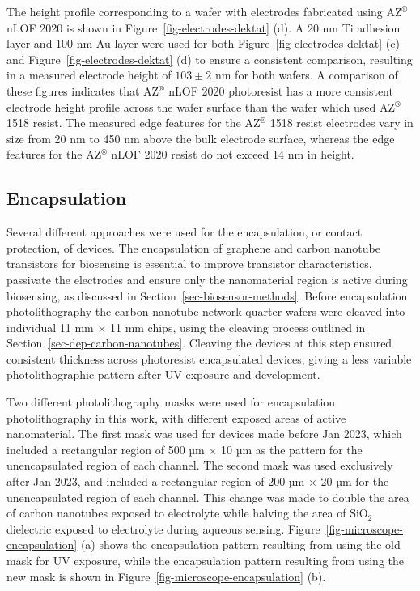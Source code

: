 \documentclass[
  a4paper,
]{scrbook}
\begin{document}
The height profile corresponding to a wafer with electrodes fabricated
using AZ\(^\circledR\) nLOF 2020 is shown in
Figure~\ref{fig-electrodes-dektat} (d). A 20 nm Ti adhesion layer and
100 nm Au layer were used for both Figure~\ref{fig-electrodes-dektat}
(c) and Figure~\ref{fig-electrodes-dektat} (d) to ensure a consistent
comparison, resulting in a measured electrode height of \(103 \pm 2\) nm
for both wafers. A comparison of these figures indicates that
AZ\(^\circledR\) nLOF 2020 photoresist has a more consistent electrode
height profile across the wafer surface than the wafer which used
AZ\(^\circledR\) 1518 resist. The measured edge features for the
AZ\(^\circledR\) 1518 resist electrodes vary in size from 20 nm to 450
nm above the bulk electrode surface, whereas the edge features for the
AZ\(^\circledR\) nLOF 2020 resist do not exceed 14 nm in height.

\hypertarget{sec-encapsulation}{%
\subsection{Encapsulation}\label{sec-encapsulation}}

Several different approaches were used for the encapsulation, or contact
protection, of devices. The encapsulation of graphene and carbon
nanotube transistors for biosensing is essential to improve transistor
characteristics, passivate the electrodes and ensure only the
nanomaterial region is active during biosensing, as discussed in
Section~\ref{sec-biosensor-methods}. Before encapsulation
photolithography the carbon nanotube network quarter wafers were cleaved
into individual 11 mm \(\times\) 11 mm chips, using the cleaving process
outlined in Section~\ref{sec-dep-carbon-nanotubes}. Cleaving the devices
at this step ensured consistent thickness across photoresist
encapsulated devices, giving a less variable photolithographic pattern
after UV exposure and development.

Two different photolithography masks were used for encapsulation
photolithography in this work, with different exposed areas of active
nanomaterial. The first mask was used for devices made before Jan 2023,
which included a rectangular region of 500 µm \(\times\) 10 µm as the
pattern for the unencapsulated region of each channel. The second mask
was used exclusively after Jan 2023, and included a rectangular region
of 200 µm \(\times\) 20 µm for the unencapsulated region of each
channel. This change was made to double the area of carbon nanotubes
exposed to electrolyte while halving the area of SiO\(_2\) dielectric
exposed to electrolyte during aqueous sensing.
Figure~\ref{fig-microscope-encapsulation} (a) shows the encapsulation
pattern resulting from using the old mask for UV exposure, while the
encapsulation pattern resulting from using the new mask is shown in
Figure~\ref{fig-microscope-encapsulation} (b).
\end{document}

